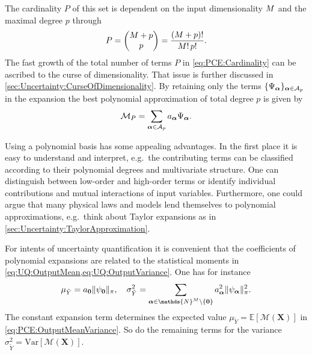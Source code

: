 The cardinality \(P\) of this set is dependent on the input dimensionality \(M\) and the maximal degree \(p\) through
\begin{equation} \label{eq:PCE:Cardinality}
  P = \begin{pmatrix}
        M + p \\
        p \\
      \end{pmatrix}
    = \frac{(M + p)!}{M! \, p!}.
\end{equation}
The fast growth of the total number of terms \(P\) in \cref{eq:PCE:Cardinality} can be ascribed to the curse of dimensionality.
That issue is further discussed in \cref{sec:Uncertainty:CurseOfDimensionality}.
By retaining only the terms \(\{\Psi_{\bm{\alpha}}\}_{\bm{\alpha} \in \mathcal{A}_p}\) in the expansion
the best polynomial approximation of total degree \(p\) is given by
\begin{equation} \label{eq:PCE:TruncatedApproximation}
  \mathcal{M}_P = \sum\limits_{\bm{\alpha} \in \mathcal{A}_p} a_{\bm{\alpha}} \Psi_{\bm{\alpha}}.
\end{equation}
\par %
Using a polynomial basis has some appealing advantages.
In the first place it is easy to understand and interpret, e.g.\ the contributing terms can be classified according to their polynomial degrees and multivariate structure.
One can distinguish between low-order and high-order terms or identify individual contributions and mutual interactions of input variables.
Furthermore, one could argue that many physical laws and models lend themselves to polynomial approximations,
e.g.\ think about Taylor expansions as in \cref{sec:Uncertainty:TaylorApproximation}.
\par %
For intents of uncertainty quantification it is convenient that the coefficients of polynomial expansions
are related to the statistical moments in \cref{eq:UQ:OutputMean,eq:UQ:OutputVariance}.
One has for instance
\begin{equation} \label{eq:PCE:OutputMeanVariance}
  \mu_{\tilde{Y}} = \coeffM_{\bm{0}} \lVert \basisU_{\bm{0}} \rVert_\pi, \quad
  \sigma_{\tilde{Y}}^2 = \sum_{\bm{\alpha} \in \mathds{N}^\dimParam  \setminus \{\bm{0}\}} \coeffM_{\bm{\alpha}}^2 \lVert \basisU_{\bm{\alpha}} \rVert_\pi^2.
\end{equation}
The constant expansion term determines the expected value \(\mu_{\tilde{Y}} = \mathds{E}[\mathcal{M}(\bm{X})]\) in \cref{eq:PCE:OutputMeanVariance}.
So do the remaining terms for the variance \(\sigma_{\tilde{Y}}^2 = \mathrm{Var}[\mathcal{M}(\bm{X})]\).